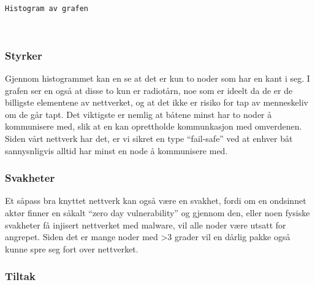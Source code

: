\documentclass[11pt]{article}
\begin{document}
    \begin{center}
    \end{center}
    { \hspace*{\fill} \\}
    
    \begin{Verbatim}[commandchars=\\\{\}]
Histogram av grafen
    \end{Verbatim}

    \begin{center}
    \end{center}
    { \hspace*{\fill} \\}
    
    \hypertarget{styrker}{%
\subsubsection*{Styrker}\label{styrker}}

Gjennom histogrammet kan en se at det er kun to noder som har en kant i
seg. I grafen ser en også at disse to kun er radiotårn, noe som er
ideelt da de er de billigste elementene av nettverket, og at det ikke er
risiko for tap av menneskeliv om de går tapt. Det viktigste er nemlig at
båtene minst har to noder å kommunisere med, slik at en kan oprettholde
kommunkasjon med omverdenen. Siden vårt nettverk har det, er vi sikret
en type ``fail-safe'' ved at enhver båt sannysnligvis alltid har minst
en node å kommunisere med.

\hypertarget{svakheter}{%
\subsubsection*{Svakheter}\label{svakheter}}

Et såpass bra knyttet nettverk kan også være en svakhet, fordi om en
ondsinnet aktør finner en såkalt ``zero day vulnerability'' og gjennom
den, eller noen fysiske svakheter få injisert nettverket med malware,
vil alle noder være utsatt for angrepet. Siden det er mange noder med
\textgreater3 grader vil en dårlig pakke også kunne spre seg fort over
nettverket.

\hypertarget{tiltak}{%
\subsubsection*{Tiltak}\label{tiltak}}
\end{document}
